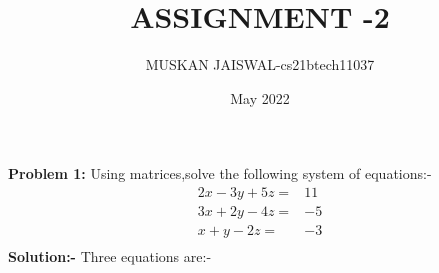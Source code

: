 \documentclass[two column]{article}
\title{ASSIGNMENT -2}
\author{MUSKAN JAISWAL-cs21btech11037}
\date{May 2022}
\begin{document}
\newcommand{\solution}{\noindent \textbf{solution}}
\newcommand{\myvec}[1]{\ensuremath{\begin{pmatrix}#1\end{pmatrix}}}
\newcommand{\mydet}[1]{\ensuremath{\begin{vmatrix}#1\end{vmatrix}}}
\let\vec\mathbf
\maketitle

\textbf{Problem 1: } Using matrices,solve the following system of equations:-
\begin{align*}
2x-3y+5z=&11\\
3x+2y-4z=&-5\\
x+y-2z=&-3\\
\end{align*}
\textbf{Solution:-}  Three equations are:-
\end{document}
